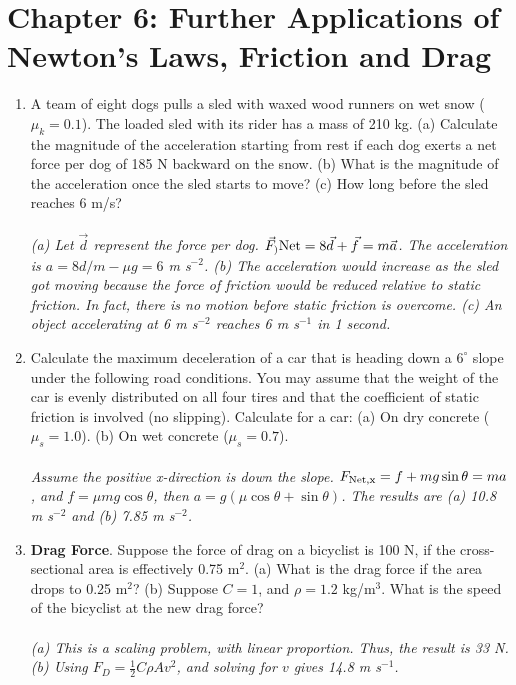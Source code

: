 \documentclass[10pt]{article}
\begin{document}
\section{Chapter 6: Further Applications of Newton's Laws, Friction and Drag}

\begin{enumerate}
\item A team of eight dogs pulls a sled with waxed wood runners on wet snow ($\mu_k = 0.1$). The loaded sled with its rider has a mass of 210 kg.  (a) Calculate the magnitude of the acceleration starting from rest if each dog exerts a net force per dog of 185 N backward on the snow. (b) What is the magnitude of the acceleration once the sled starts to move? (c) How long before the sled reaches 6 m/s? \\ \\
\textit{(a) Let $\vec{d}$ represent the force per dog.  $\vec{F}_){\rm Net} = 8\vec{d} + \vec{f} = m \vec{a}$.  The acceleration is $a = 8d/m - \mu g = 6$ m s$^{-2}$. (b) The acceleration would increase as the sled got moving because the force of friction would be reduced relative to static friction.  In fact, there is no motion before static friction is overcome. (c) An object accelerating at 6 m s$^{-2}$ reaches 6 m s$^{-1}$ in 1 second. }
\item Calculate the maximum deceleration of a car that is heading down a $6^{\circ}$ slope under the following road conditions. You may assume that the weight of the car is evenly distributed on all four tires and that the coefficient of static friction is involved (no slipping).  Calculate for a car: (a) On dry concrete ($\mu_s = 1.0$). (b) On wet concrete ($\mu_s = 0.7$). \\ \\
\textit{Assume the positive x-direction is down the slope.  $F_{\rm Net,x} = f+mg\sin\theta = ma$, and $f = \mu m g \cos\theta$, then $a = g(\mu\cos\theta + \sin\theta)$.  The results are (a) 10.8 m s$^{-2}$ and (b) 7.85 m s$^{-2}$.}
\item \textbf{Drag Force}.  Suppose the force of drag on a bicyclist is 100 N, if the cross-sectional area is effectively 0.75 m$^2$. (a) What is the drag force if the area drops to 0.25 m$^2$? (b) Suppose $C = 1$, and $\rho = 1.2$ kg/m$^3$.  What is the speed of the bicyclist at the new drag force?  \\ \\
\textit{(a) This is a scaling problem, with linear proportion.  Thus, the result is 33 N. (b) Using $F_D = \frac{1}{2} C \rho A v^2$, and solving for $v$ gives 14.8 m s$^{-1}$.}

\end{enumerate}
\end{document}
